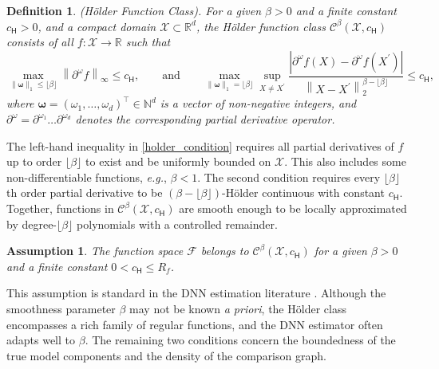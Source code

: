 \documentclass[
  12pt]{article}
\newtheorem{assumption}{Assumption}
\newtheorem{definition}{Definition}
\begin{document}
\begin{definition}\label{holder_class} (Hölder Function Class). For a given $\beta>0$ and a finite constant $ c_{\mathsf{H}}>0$, and a compact domain $\mathcal{X} \subset \mathbb{R}^d$, the Hölder function class $\mathcal{C}^\beta\left(\mathcal{X}, c_{\mathsf{H}}\right)$ consists of all $f: \mathcal{X} \rightarrow \mathbb{R}$ such that 
\begin{equation}\label{holder_condition}
\max _{\|\boldsymbol{\omega}\|_1 \leq\lfloor\beta\rfloor}\left\|\partial^\omega f\right\|_{\infty} \leq c_{\mathsf{H}}, \quad\quad\text{and}\quad\quad \max _{\|\boldsymbol{\omega}\|_1=\lfloor\beta\rfloor} \sup _{X \neq X^{\prime}} \frac{\left|\partial^\omega f(X)-\partial^\omega f\left(X^{\prime}\right)\right|}{\left\|X-X^{\prime}\right\|_2^{\beta-\lfloor\beta\rfloor}} \leq c_{\mathsf{H}},\end{equation} 
\noindent where $\boldsymbol{\omega}=\left(\omega_1, \ldots, \omega_d\right)^{\top}\in\mathbb N^d$ is a vector of non-negative integers, and $\partial^\omega=\partial^{\omega_1} \ldots \partial^{\omega_d}$ denotes the corresponding partial derivative operator.
\end{definition}
The left-hand inequality in \eqref{holder_condition} requires all partial derivatives of $f$ up 
to order $\lfloor\beta\rfloor$ to exist and be uniformly bounded on 
$\mathcal{X}$. This also includes some non-differentiable functions, \textit{e.g.}, $\beta<1$. The second condition requires every $\lfloor\beta\rfloor$th order partial derivative to be $(\beta-\lfloor\beta\rfloor)$-H\"older continuous with constant $c_{\mathsf{H}}$. Together, functions in 
$\mathcal{C}^\beta(\mathcal{X}, c_{\mathsf{H}})$ are 
smooth enough to be locally approximated by degree-$\lfloor\beta
\rfloor$ polynomials with a controlled remainder.

\begin{assumption}\label{holder_smooth}
    The function space $\mathcal F$ belongs to $\mathcal{C}^\beta(\mathcal{X}, c_{\mathsf{H}})$ for a given $\beta>0$ and a finite constant $0<c_{\mathsf{H}}\leq R_f$.
\end{assumption}

This assumption is standard in the DNN estimation literature \citep{schmidt2020nonparametric, farrell2021deep, jiao_deepnonparametric}. Although the smoothness parameter $\beta$ may not be known \textit{a priori}, the H\"older class encompasses a rich family of regular functions, and the DNN estimator often adapts well to $\beta$. %
The remaining two conditions concern the boundedness of the true model components and the density of the comparison graph.
\end{document}
